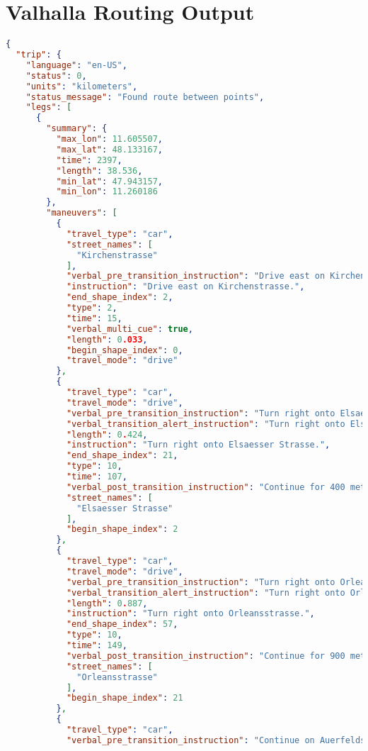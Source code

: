 \section{Valhalla Routing Output} \label{VRO}
\begin{lstlisting}[language=json,breaklines=true]
{
  "trip": {
    "language": "en-US",
    "status": 0,
    "units": "kilometers",
    "status_message": "Found route between points",
    "legs": [
      {
        "summary": {
          "max_lon": 11.605507,
          "max_lat": 48.133167,
          "time": 2397,
          "length": 38.536,
          "min_lat": 47.943157,
          "min_lon": 11.260186
        },
        "maneuvers": [
          {
            "travel_type": "car",
            "street_names": [
              "Kirchenstrasse"
            ],
            "verbal_pre_transition_instruction": "Drive east on Kirchenstrasse for 30 meters. Then Turn right onto Elsaesser Strasse.",
            "instruction": "Drive east on Kirchenstrasse.",
            "end_shape_index": 2,
            "type": 2,
            "time": 15,
            "verbal_multi_cue": true,
            "length": 0.033,
            "begin_shape_index": 0,
            "travel_mode": "drive"
          },
          {
            "travel_type": "car",
            "travel_mode": "drive",
            "verbal_pre_transition_instruction": "Turn right onto Elsaesser Strasse.",
            "verbal_transition_alert_instruction": "Turn right onto Elsaesser Strasse.",
            "length": 0.424,
            "instruction": "Turn right onto Elsaesser Strasse.",
            "end_shape_index": 21,
            "type": 10,
            "time": 107,
            "verbal_post_transition_instruction": "Continue for 400 meters.",
            "street_names": [
              "Elsaesser Strasse"
            ],
            "begin_shape_index": 2
          },
          {
            "travel_type": "car",
            "travel_mode": "drive",
            "verbal_pre_transition_instruction": "Turn right onto Orleansstrasse.",
            "verbal_transition_alert_instruction": "Turn right onto Orleansstrasse.",
            "length": 0.887,
            "instruction": "Turn right onto Orleansstrasse.",
            "end_shape_index": 57,
            "type": 10,
            "time": 149,
            "verbal_post_transition_instruction": "Continue for 900 meters.",
            "street_names": [
              "Orleansstrasse"
            ],
            "begin_shape_index": 21
          },
          {
            "travel_type": "car",
            "verbal_pre_transition_instruction": "Continue on Auerfeldstrasse for 200 meters.",

\end{lstlisting}
